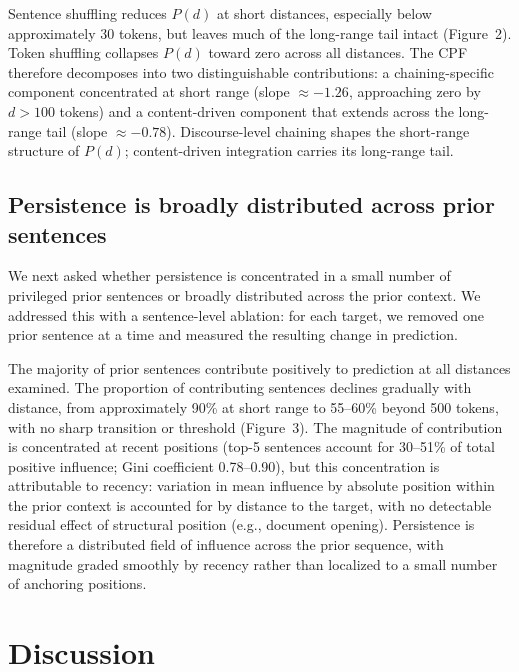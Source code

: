 \documentclass[11pt]{article}
\begin{document}
Sentence shuffling reduces $P(d)$ at short distances, especially below approximately 30
tokens, but leaves much of the long-range tail intact (Figure~2). Token shuffling
collapses $P(d)$ toward zero across all distances. The CPF therefore
decomposes into two distinguishable contributions: a chaining-specific component
concentrated at short range (slope $\approx -1.26$, approaching zero by $d > 100$
tokens) and a content-driven component that extends across the long-range tail (slope
$\approx -0.78$). Discourse-level chaining shapes the short-range structure of $P(d)$;
content-driven integration carries its long-range tail.

\subsection{Persistence is broadly distributed across prior sentences}

We next asked whether persistence is concentrated in a small number of privileged prior
sentences or broadly distributed across the prior context. We addressed this with a
sentence-level ablation: for each target, we removed one prior sentence at a time and
measured the resulting change in prediction.

The majority of prior sentences contribute positively to prediction at all distances
examined. The proportion of contributing sentences declines gradually with distance,
from approximately 90\% at short range to 55--60\% beyond 500 tokens, with no sharp
transition or threshold (Figure~3). The magnitude of contribution is concentrated at
recent positions (top-5 sentences account for 30--51\% of total positive influence;
Gini coefficient 0.78--0.90), but this concentration is attributable to recency:
variation in mean influence by absolute position within the prior context is accounted
for by distance to the target, with no detectable residual effect of structural position
(e.g., document opening). Persistence is therefore a distributed field of influence across the
prior sequence, with magnitude graded smoothly by recency rather than localized to a
small number of anchoring positions.

\section{Discussion}
\end{document}
